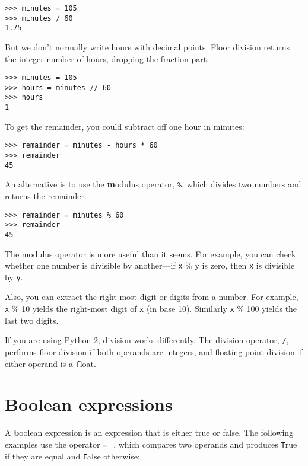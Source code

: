 \documentclass[
DIV=11,
fontsize=12,
twoside,
headinclude=false,
titlepage=firstiscover,
abstract=true,
headsepline=true,
footsepline=true,
chapterprefix=true, %
headings=big,
bibliography=totoc,%
captions=tableheading
]{scrbook}
\theoremstyle{definition}
\begin{document}
\begin{lstlisting}
>>> minutes = 105
>>> minutes / 60
1.75
\end{lstlisting}

But we don't normally write hours with decimal points.  Floor
division returns the integer number of hours, dropping the
fraction part:

\begin{lstlisting}
>>> minutes = 105
>>> hours = minutes // 60
>>> hours
1
\end{lstlisting}

To get the remainder, you could subtract off one hour in minutes:

\begin{lstlisting}
>>> remainder = minutes - hours * 60
>>> remainder
45
\end{lstlisting}


An alternative is to use the {\textbf modulus operator}, \verb"%", which
divides two numbers and returns the remainder.

\begin{lstlisting}
>>> remainder = minutes % 60
>>> remainder
45
\end{lstlisting}
%
The modulus operator is more useful than it seems.  For
example, you can check whether one number is divisible by another---if
{\texttt x \% y} is zero, then {\texttt x} is divisible by {\texttt y}.

Also, you can extract the right-most digit
or digits from a number.  For example, {\texttt x \% 10} yields the
right-most digit of {\texttt x} (in base 10).  Similarly {\texttt x \% 100}
yields the last two digits.

If you are using Python 2, division works differently.  The
division operator, \verb"/", performs floor division if both
operands are integers, and floating-point division if either
operand is a {\texttt float}.


\section{Boolean expressions}

A {\textbf boolean expression} is an expression that is either true
or false.  The following examples use the 
operator {\texttt ==}, which compares two operands and produces
{\texttt True} if they are equal and {\texttt False} otherwise:
\end{document}
